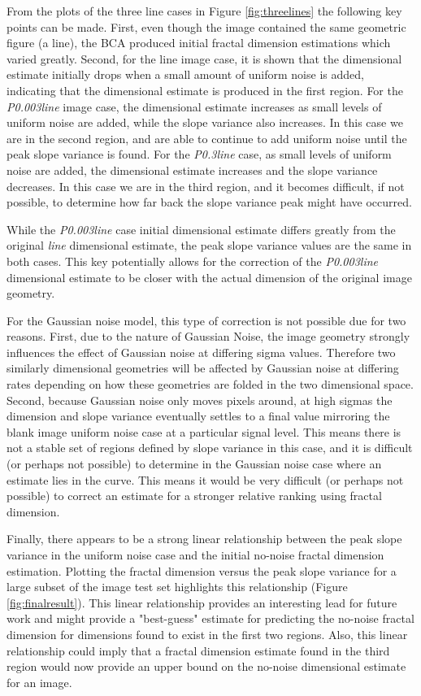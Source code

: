 \documentclass[12pt, oneside]{book}
\begin{document}
From the plots of the three line cases in Figure \ref{fig:threelines} the following key points can be made.  First, even though the image contained the same geometric figure (a line), the BCA produced initial fractal dimension estimations which varied greatly.  Second, for the line image case, it is shown that the dimensional estimate initially drops when a small amount of uniform noise is added, indicating that the dimensional estimate is produced in the first region.  For the \textit{P0.003line} image case, the dimensional estimate increases as small levels of uniform noise are added, while the slope variance also increases.  In this case we are in the second region, and are able to continue to add uniform noise until the peak slope variance is found.  For the \textit{P0.3line} case, as small levels of uniform noise are added, the dimensional estimate increases and the slope variance decreases.  In this case we are in the third region, and it becomes difficult, if not possible, to determine how far back the slope variance peak might have occurred.

While the \textit{P0.003line} case initial dimensional estimate differs greatly from the original \textit{line} dimensional estimate, the peak slope variance values are the same in both cases.  This key potentially allows for the correction of the \textit{P0.003line} dimensional estimate to be closer with the actual dimension of the original image geometry.

For the Gaussian noise model, this type of correction is not possible due for two reasons.  First, due to the nature of Gaussian Noise, the image geometry strongly influences the effect of Gaussian noise at differing sigma values.  Therefore two similarly dimensional geometries will be affected by Gaussian noise at differing rates depending on how these geometries are folded in the two dimensional space.  Second, because Gaussian noise only moves pixels around, at high sigmas the dimension and slope variance eventually settles to a final value mirroring the blank image uniform noise case at a particular signal level.  This means there is not a stable set of regions defined by slope variance in this case, and it is difficult (or perhaps not possible) to determine in the Gaussian noise case where an estimate lies in the curve.  This means it would be very difficult (or perhaps not possible) to correct an estimate for a stronger relative ranking using fractal dimension.

Finally, there appears to be a strong linear relationship between the peak slope variance in the uniform noise case and the initial no-noise fractal dimension estimation.  Plotting the fractal dimension versus the peak slope variance for a large subset of the image test set highlights this relationship (Figure \ref{fig:finalresult}).  This linear relationship provides an interesting lead for future work and might provide a "best-guess" estimate for predicting the no-noise fractal dimension for dimensions found to exist in the first two regions.  Also, this linear relationship could imply that a fractal dimension estimate found in the third region would now provide an upper bound on the no-noise dimensional estimate for an image.
\end{document}
